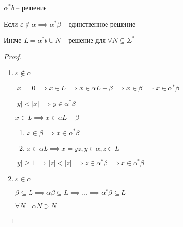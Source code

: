 \documentclass{book}
\theoremstyle{definition}
\begin{document}
\begin{lemma}
    $\alpha^*b$ -- решение
\end{lemma}

\begin{theorem}
    Если $\varepsilon \not\in \alpha \implies  \alpha^*\beta$ -- единственное решение

    Иначе $L = \alpha^*b \cup N$ -- решение для $\forall N\subseteq \Sigma^*$
\end{theorem}
\begin{proof}
    \begin{enumerate}
        \item $\varepsilon \not\in \alpha$

            $|x| = 0 \implies x\in L \implies x\in \alpha L + \beta \implies  x\in \beta \implies  x\in \alpha^*\beta$

            $|y| <|x| \implies  y\in \alpha^*\beta$

            $x\in L \implies x\in \alpha L + \beta$

             \begin{enumerate}
                 \item $x\in \beta \implies x\in \alpha^*\beta$
                 \item $x\in \alpha L \implies  x = yz, y\in \alpha, z\in L$
             \end{enumerate}
             $|y|\geqslant 1 \implies |z| <|z| \implies z\in \alpha^*\beta \implies x\in \alpha^*\beta$
         \item $\varepsilon\in \alpha$

             $\beta \subseteq L \implies \alpha\beta\subseteq L \implies  \ldots \implies \alpha^*\beta \subseteq L$

             $\forall N\quad \alpha N \supset N$
    \end{enumerate}
\end{proof}
\end{document}
